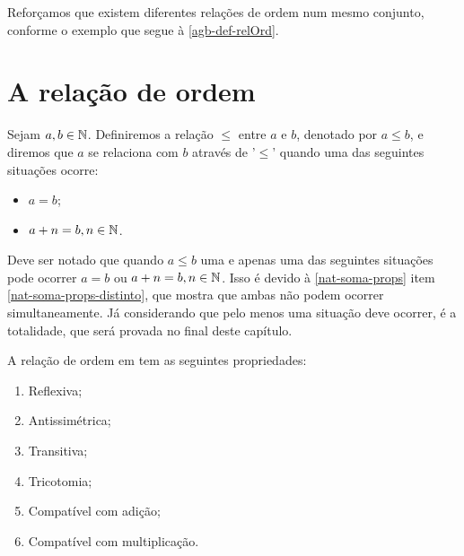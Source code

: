 \documentclass[../main.tex]{subfiles}
\begin{document}
Reforçamos que existem diferentes relações de ordem num mesmo conjunto, conforme o exemplo que segue à \cref{agb-def-relOrd}.

\section{A relação de ordem}
\begin{defi}\label{def-relOrdem-N}
Sejam $a, b \in \mathbb{N}$. Definiremos a relação $\leq$ entre $a$ e $b$, denotado por $a \leq b$, e diremos que $a$ se relaciona com $b$ através de '$\leq$' quando uma das seguintes situações ocorre:
    \begin{itemize}
        \item $a = b$;
        \item $a + n = b, n \in \mathbb{N}$.
    \end{itemize} 
\end{defi}
\begin{obs}
    Deve ser notado que quando $a \leq b$ uma e apenas uma das seguintes situações pode ocorrer $a = b$ ou $a + n = b, n \in \mathbb{N}$. Isso é devido à \cref{nat-soma-props} item \ref{nat-soma-props-distinto}, que mostra que ambas não podem ocorrer simultaneamente. Já considerando que pelo menos uma situação deve ocorrer, é a totalidade, que será provada no final deste capítulo. 
\end{obs}
\begin{prop}{A relação de ordem em \N tem as seguintes propriedades:}
    \begin{enumerate}[label=(\roman*)]
        \item Reflexiva;
        \item Antissimétrica;
        \item Transitiva;
        \item Tricotomia;
        \item Compatível com adição;
        \item Compatível com multiplicação.
    \end{enumerate}
\end{prop}
\end{document}
